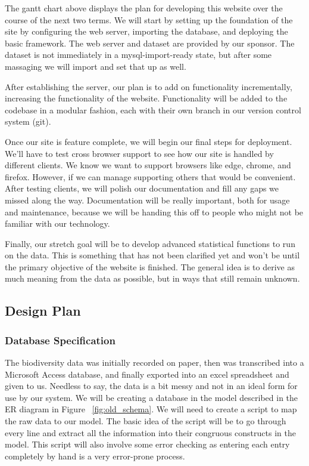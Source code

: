 The gantt chart above displays the plan for developing this website over the course of the next two terms.
We will start by setting up the foundation of the site by configuring the web server, importing the database, and deploying the basic framework.
The web server and dataset are provided by our sponsor. The dataset is not immediately in a mysql-import-ready state, but after some massaging we will import and set that up as well. 

After establishing the server, our plan is to add on functionality incrementally, increasing the functionality of the website.
Functionality will be added to the codebase in a modular fashion, each with their own branch in our version control system (git). 

Once our site is feature complete, we will begin our final steps for deployment.
We’ll have to test cross browser support to see how our site is handled by different clients.
We know we want to support browsers like edge, chrome, and firefox.
However, if we can manage supporting others that would be convenient.
After testing clients, we will polish our documentation and fill any gaps we missed along the way.
Documentation will be really important, both for usage and maintenance, because we will be handing this off to people who might not be familiar with our technology. 

Finally, our stretch goal will be to develop advanced statistical functions to run on the data.
This is something that has not been clarified yet and won’t be until the primary objective of the website is finished.
The general idea is to derive as much meaning from the data as possible, but in ways that still remain unknown.

\subsection{Design Plan}

\subsubsection{Database Specification}
The biodiversity data was initially recorded on paper, then was transcribed into a Microsoft Access database, and finally exported into an excel spreadsheet and given to us.
Needless to say, the data is a bit messy and not in an ideal form for use by our system.
We will be creating a database in the model described in the ER diagram in Figure ~\ref{fig:old_schema}.
We will need to create a script to map the raw data to our model.
The basic idea of the script will be to go through every line and extract all the information into their congruous constructs in the model.
This script will also involve some error checking as entering each entry completely by hand is a very error-prone process. 


